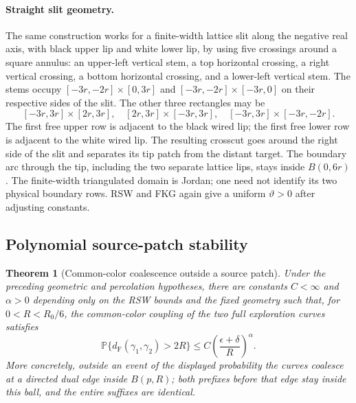 \documentclass[11pt]{article}
\newtheorem{theorem}{Theorem}[section]
\theoremstyle{definition}\newtheorem{definition}[theorem]{Definition}
\theoremstyle{remark}\newtheorem{remark}[theorem]{Remark}
\begin{document}
\paragraph{Straight slit geometry.}
The same construction works for a finite-width lattice slit along the
negative real axis, with black upper lip and white lower lip, by using
five crossings around a square annulus: an upper-left vertical stem,
a top horizontal crossing, a right vertical crossing, a bottom horizontal
crossing, and a lower-left vertical stem. The stems occupy
$[-3r,-2r]\times[0,3r]$ and
$[-3r,-2r]\times[-3r,0]$ on their respective sides of the slit.
The other three rectangles may be
\[
 [-3r,3r]\times[2r,3r],\quad
 [2r,3r]\times[-3r,3r],\quad
 [-3r,3r]\times[-3r,-2r].
\]
The first free upper row is adjacent to the black wired lip; the first
free lower row is adjacent to the white wired lip. The resulting crosscut
goes around the right side of the slit and separates its tip patch from
the distant target. The boundary arc through the tip, including the two
separate lattice lips, stays inside $B(0,6r)$. The finite-width triangulated
domain is Jordan; one need not identify its two physical boundary rows.
RSW and FKG again give a uniform $\vartheta>0$ after adjusting constants.

\subsection{Polynomial source-patch stability}

\begin{theorem}[Common-color coalescence outside a source patch]
\label{thm:ss-coalescence}
Under the preceding geometric and percolation hypotheses, there are
constants $C<\infty$ and $\alpha>0$ depending only on the RSW bounds and
the fixed geometry such that, for $0<R<R_0/6$, the common-color coupling
of the two full exploration curves satisfies
\[
 \mathbb P\{d_{\mathrm F}(\gamma_1,\gamma_2)>2R\}
       \leq C\left(\frac{\epsilon+\delta}{R}\right)^\alpha.
 \tag{SH1}
\]
More concretely, outside an event of the displayed probability the curves
coalesce at a directed dual edge inside $B(p,R)$; both prefixes before
that edge stay inside this ball, and the entire suffixes are identical.
\end{theorem}
\end{document}
